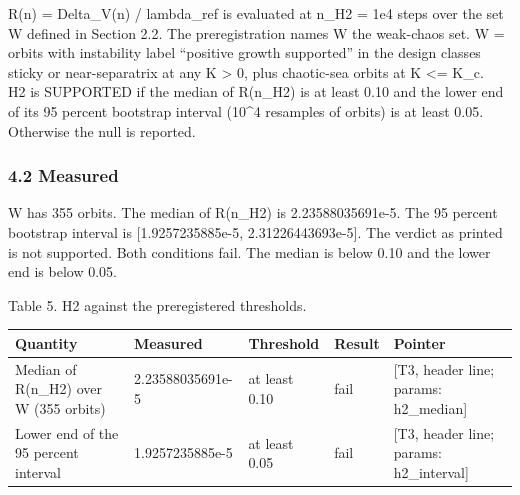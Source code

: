 \documentclass[
  11pt,
]{article}
\newcounter{none} %
\begin{document}
R(n) = Delta\_V(n) / lambda\_ref is evaluated at n\_H2 = 1e4 steps over
the set W defined in Section 2.2. The preregistration names W the
weak-chaos set. W = orbits with instability label ``positive growth
supported'' in the design classes sticky or near-separatrix at any K
\textgreater{} 0, plus chaotic-sea orbits at K \textless= K\_c.~ H2 is
SUPPORTED if the median of R(n\_H2) is at least 0.10 and the lower end
of its 95 percent bootstrap interval (10\^{}4 resamples of orbits) is at
least 0.05. Otherwise the null is reported.

\subsubsection{4.2 Measured}\label{measured-1}

W has 355 orbits. The median of R(n\_H2) is 2.23588035691e-5. The 95
percent bootstrap interval is {[}1.9257235885e-5, 2.31226443693e-5{]}.
The verdict as printed is not supported. Both conditions fail. The
median is below 0.10 and the lower end is below 0.05.

Table 5. H2 against the preregistered thresholds.

{\def\LTcaptype{none} %
\begin{longtable}[]{@{}
  >{\raggedright\arraybackslash}p{}
  >{\raggedright\arraybackslash}p{}
  >{\raggedright\arraybackslash}p{}
  >{\raggedright\arraybackslash}p{}
  >{\raggedright\arraybackslash}p{}@{}}
\toprule\noalign{}
\begin{minipage}[b]{\linewidth}\raggedright
Quantity
\end{minipage} & \begin{minipage}[b]{\linewidth}\raggedright
Measured
\end{minipage} & \begin{minipage}[b]{\linewidth}\raggedright
Threshold
\end{minipage} & \begin{minipage}[b]{\linewidth}\raggedright
Result
\end{minipage} & \begin{minipage}[b]{\linewidth}\raggedright
Pointer
\end{minipage} \\
\midrule\noalign{}
\endhead
\bottomrule\noalign{}
\endlastfoot
Median of R(n\_H2) over W (355 orbits) & 2.23588035691e-5 & at least
0.10 & fail & {[}T3, header line; params: h2\_median{]} \\
Lower end of the 95 percent interval & 1.9257235885e-5 & at least 0.05 &
fail & {[}T3, header line; params: h2\_interval{]} \\
\end{longtable}
}
\end{document}
